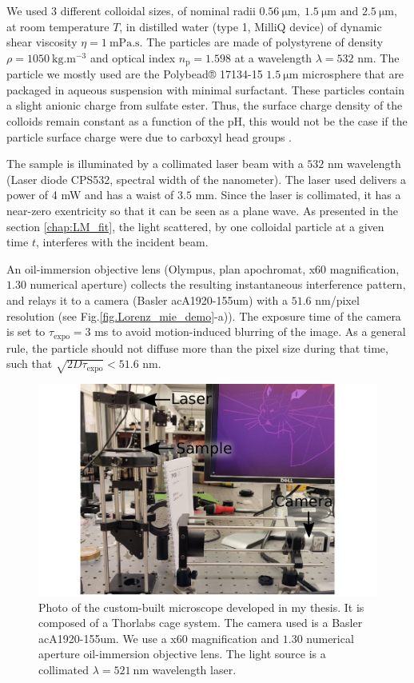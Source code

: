 We used 3 different colloidal sizes, of nominal radii $0.56 ~ \mathrm{\mu m}, ~ 1.5 ~ \mathrm{\mu m} \text{ and } 2.5 ~ \mathrm{\mu m} $, at room temperature $T$, in distilled water (type 1, MilliQ device) of dynamic shear viscosity $\eta = 1 ~ \mathrm{mPa.s}$. The particles are made of polystyrene of density $\rho = 1050  ~\mathrm{kg.m^{-3}}$ and optical index $n_\mathrm{p} = 1.598$ at a wavelength $\lambda = 532$ nm. The particle we mostly used are the Polybead® 17134-15 $1.5 ~ \mathrm{\mu m}$ microsphere that are packaged in aqueous suspension with minimal surfactant. These particles contain a slight anionic charge from sulfate ester. Thus, the surface charge density of the colloids remain constant as a function of the pH, this would not be the case if the particle surface charge were due to carboxyl head groups \cite{behrens_charge_2001}.

The sample is illuminated by a collimated laser beam with a $532$ nm wavelength (Laser diode CPS532, spectral width of the nanometer). The laser used delivers a power of 4 mW and has a waist of $3.5$ mm. Since the laser is collimated, it has a near-zero exentricity so that it can be seen as a plane wave. As presented in the section \ref{chap:LM_fit}, the light scattered, by one colloidal particle at a given time $t$, interferes with the incident beam. 

An oil-immersion objective lens (Olympus, plan apochromat, x60 magnification, $1.30$ numerical aperture) collects the resulting instantaneous interference pattern, and relays it to a camera (Basler acA1920-155um) with a $51.6$ nm/pixel resolution (see Fig.\ref{fig.Lorenz_mie_demo}-a)). The exposure time of the camera is set to $\tau_{\mathrm{expo}} = 3$ ms to avoid motion-induced blurring of the image. As a general rule, the particle should not diffuse more than the pixel size during that time, such that $\sqrt{2D\tau_{\mathrm{expo}} }< 51.6$ nm.

\begin{figure}[!ht]
	\centering
	\includegraphics{02_body/chapter2/images/figures_setup/photo_setup.pdf}
	\caption{Photo of the custom-built microscope developed in my thesis. It is composed of a Thorlabs cage system. The camera used is a Basler acA1920-155um. We use a x60 magnification and $1.30$ numerical aperture oil-immersion objective lens. The light source is a collimated  $ \lambda = 521 ~ \mathrm{n m}$ wavelength laser.}
	\label{fig:picture}
\end{figure}


